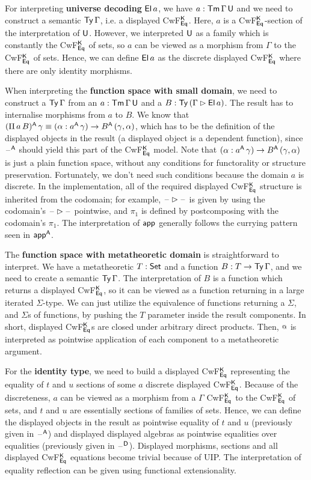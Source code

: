 \documentclass[acmsmall,screen]{acmart}
\begin{document}
For interpreting \textbf{universe decoding} $\mathsf{El}\,a$, we have $a :
\mathsf{Tm}\,\Gamma\,\mathsf{U}$ and we need to construct a semantic $\mathsf{Ty}\,\Gamma$,
i.e. a displayed CwF$^{\mathsf{K}}_{\mathsf{Eq}}$. Here, $a$ is a CwF$^{\mathsf{K}}_{\mathsf{Eq}}$-section
of the interpretation of $\mathsf{U}$. However, we interpreted $\mathsf{U}$ as a
family which is constantly the CwF$^{\mathsf{K}}_{\mathsf{Eq}}$ of sets, so $a$ can be
viewed as a morphism from $\Gamma$ to the CwF$^{\mathsf{K}}_{\mathsf{Eq}}$ of
sets. Hence, we can define $\mathsf{El}\,a$ as the discrete
displayed CwF$^{\mathsf{K}}_{\mathsf{Eq}}$ where there are only identity morphisms.

When interpreting the \textbf{function space with small domain}, we
need to construct a $\mathsf{Ty}\,\Gamma$ from an $a : \mathsf{Tm}\,\Gamma\,\mathsf{U}$ and a
$B : \mathsf{Ty}\,(\Gamma\rhd\mathsf{El}\,a)$. The result has to internalise morphisms
from $a$ to $B$. We know that $(\Pi\,a\,B)^{\mathsf{A}}\,\gamma \equiv
(\alpha:a^{\mathsf{A}}\,\gamma)\rightarrow B^{\mathsf{A}}\,(\gamma, \alpha)$, which has to be the
definition of the displayed objects in the result (a displayed object
is a dependent function), since $\mathord{\hspace{1pt}\text{--}\hspace{1pt}}^{\mathsf{A}}$ should yield this part of
the CwF$^{\mathsf{K}}_{\mathsf{Eq}}$ model. Note that $(\alpha:a^{\mathsf{A}}\,\gamma)\rightarrow
B^{\mathsf{A}}\,(\gamma, \alpha)$ is just a plain function space, without any
conditions for functorality or structure preservation. Fortunately,
we don't need such conditions because the domain $a$ is discrete. In
the implementation, all of the required displayed CwF$^{\mathsf{K}}_{\mathsf{Eq}}$
structure is inherited from the codomain; for example,
$\mathord{\hspace{1pt}\text{--}\hspace{1pt}}\rhd\mathord{\hspace{1pt}\text{--}\hspace{1pt}}$ is given by using the codomain's $\mathord{\hspace{1pt}\text{--}\hspace{1pt}}\rhd\mathord{\hspace{1pt}\text{--}\hspace{1pt}}$
pointwise, and $\pi_1$ is defined by postcomposing with the codomain's
$\pi_1$. The interpretation of $\mathsf{app}$ generally follows the currying
pattern seen in $\mathsf{app}^{\mathsf{A}}$.

The \textbf{function space with metatheoretic domain} is straightforward
to interpret. We have a metatheoretic $T : \mathsf{Set}$ and a function $B : T
\rightarrow \mathsf{Ty}\,\Gamma$, and we need to create a semantic $\mathsf{Ty}\,\Gamma$. The
interpretation of $B$ is a function which returns a displayed
CwF$^{\mathsf{K}}_{\mathsf{Eq}}$, so it can be viewed as a function returning in a large
iterated $\Sigma$-type. We can just utilize the equivalence of
functions returning a $\Sigma$, and $\Sigma$s of functions, by pushing
the $T$ parameter inside the result components. In short, displayed
CwF$^{\mathsf{K}}_{\mathsf{Eq}}$s are closed under arbitrary direct products. Then,
$\mathop{{\scriptstyle @}}$ is interpreted as pointwise application of each component to a
metatheoretic argument.

For the \textbf{identity type}, we need to build a displayed
CwF$^{\mathsf{K}}_{\mathsf{Eq}}$ representing the equality of $t$ and $u$ sections of
some $a$ discrete displayed CwF$^{\mathsf{K}}_{\mathsf{Eq}}$. Because of the
discreteness, $a$ can be viewed as a morphism from a $\Gamma$
CwF$^{\mathsf{K}}_{\mathsf{Eq}}$ to the CwF$^{\mathsf{K}}_{\mathsf{Eq}}$ of sets, and $t$ and $u$ are
essentially sections of families of sets. Hence, we can define the
displayed objects in the result as pointwise equality of $t$ and $u$
(previously given in $\mathord{\hspace{1pt}\text{--}\hspace{1pt}}^{\mathsf{A}}$) and displayed displayed algebras as
pointwise equalities over equalities (previously given in
$\mathord{\hspace{1pt}\text{--}\hspace{1pt}}^{\mathsf{D}}$). Displayed morphisms, sections and all displayed
CwF$^{\mathsf{K}}_{\mathsf{Eq}}$ equations become trivial because of UIP. The
interpretation of equality reflection can be given using functional
extensionality.
\end{document}
